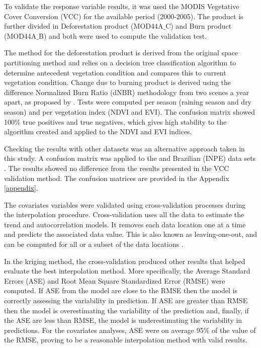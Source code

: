 

To validate the response variable results, it was used the MODIS Vegetative Cover Conversion (VCC) for the available period (2000-2005). The product is further divided in Deforestation product (MOD44A${\_}$C) and Burn product (MOD44A$\_$B) and both were used to compute the validation test. 

The method for the deforestation product is derived from the original space partitioning method \citep{zhan_2002} and relies on a decision tree classification algorithm \citep{breiman_1984} to determine antecedent vegetation condition and compares this to current vegetation condition. Change due to burning product is derived using the difference Normalized Burn Ratio (dNBR) methodology from two scenes a year apart, as proposed by \citet{key_2004}.  Tests were computed per season (raining season and dry season) and per vegetation index (NDVI and EVI). The confusion matrix showed 100\% true positives and true negatives, which gives high stability to the algorithm created and applied to the NDVI and EVI indices. 


Checking the results with other datasets was an alternative approach taken in this study. A confusion matrix was applied to the \citet{Hansen_2013} and Brazilian (INPE) data sets \citep{brito_2018}. The results showed no difference from the results presented in the VCC validation method. The confusion matrices are provided in the Appendix \ref{appendix}. 

The covariates variables were validated using cross-validation processes during the interpolation procedure. Cross-validation uses all the data to estimate the trend and autocorrelation models. It removes each data location one at a time and predicts the associated data value. This is also known as leaving-one-out, and can be computed for all or a subset of the data locations \citep{esri_2016}.

In the kriging method, the cross-validation produced other results that helped evaluate the best interpolation method. More specifically, the Average Standard Errors (ASE) and Root Mean Square Standardized Error (RMSE) were computed. If ASE from the model are close to the RMSE then the model is correctly assessing the variability in prediction. If ASE are greater than RMSE then the model is overestimating the variability of the prediction and, finally, if the ASE are less than RMSE, the model is underestimating the variability in predictions. For the covariates analyses, ASE were on average 95\% of the value of the RMSE, proving to be a reasonable interpolation method with valid results.


